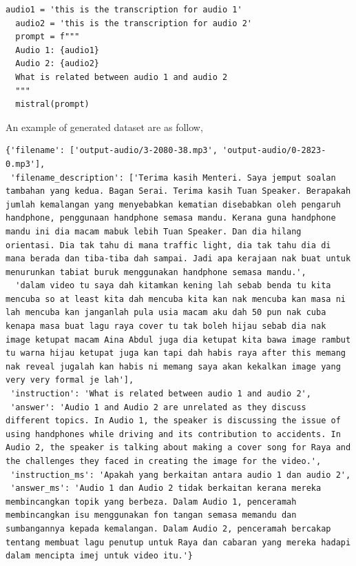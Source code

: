 \documentclass[preprint]{article}
\begin{document}
\begin{lstlisting}[breaklines=true]
  audio1 = 'this is the transcription for audio 1'
  audio2 = 'this is the transcription for audio 2'
  prompt = f"""
  Audio 1: {audio1} 
  Audio 2: {audio2}
  What is related between audio 1 and audio 2
  """
  mistral(prompt)
\end{lstlisting}

An example of generated dataset are as follow,

\begin{lstlisting}[breaklines=true]
  {'filename': ['output-audio/3-2080-38.mp3', 'output-audio/0-2823-0.mp3'],
 'filename_description': ['Terima kasih Menteri. Saya jemput soalan tambahan yang kedua. Bagan Serai. Terima kasih Tuan Speaker. Berapakah jumlah kemalangan yang menyebabkan kematian disebabkan oleh pengaruh handphone, penggunaan handphone semasa mandu. Kerana guna handphone mandu ini dia macam mabuk lebih Tuan Speaker. Dan dia hilang orientasi. Dia tak tahu di mana traffic light, dia tak tahu dia di mana berada dan tiba-tiba dah sampai. Jadi apa kerajaan nak buat untuk menurunkan tabiat buruk menggunakan handphone semasa mandu.',
  'dalam video tu saya dah kitamkan kening lah sebab benda tu kita mencuba so at least kita dah mencuba kita kan nak mencuba kan masa ni lah mencuba kan janganlah pula usia macam aku dah 50 pun nak cuba kenapa masa buat lagu raya cover tu tak boleh hijau sebab dia nak image ketupat macam Aina Abdul juga dia ketupat kita bawa image rambut tu warna hijau ketupat juga kan tapi dah habis raya after this memang nak reveal jugalah kan habis ni memang saya akan kekalkan image yang very very formal je lah'],
 'instruction': 'What is related between audio 1 and audio 2',
 'answer': 'Audio 1 and Audio 2 are unrelated as they discuss different topics. In Audio 1, the speaker is discussing the issue of using handphones while driving and its contribution to accidents. In Audio 2, the speaker is talking about making a cover song for Raya and the challenges they faced in creating the image for the video.',
 'instruction_ms': 'Apakah yang berkaitan antara audio 1 dan audio 2',
 'answer_ms': 'Audio 1 dan Audio 2 tidak berkaitan kerana mereka membincangkan topik yang berbeza. Dalam Audio 1, penceramah membincangkan isu menggunakan fon tangan semasa memandu dan sumbangannya kepada kemalangan. Dalam Audio 2, penceramah bercakap tentang membuat lagu penutup untuk Raya dan cabaran yang mereka hadapi dalam mencipta imej untuk video itu.'}
\end{lstlisting}
\end{document}

